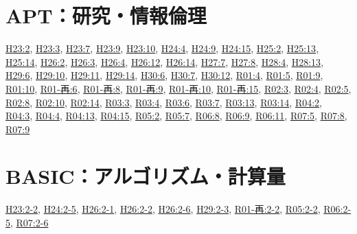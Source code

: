 \section{APT：研究・情報倫理}
\hyperref[q:h23-reg-apt-02]{H23:2}, \hyperref[q:h23-reg-apt-03]{H23:3}, \hyperref[q:h23-reg-apt-07]{H23:7}, \hyperref[q:h23-reg-apt-09]{H23:9}, \hyperref[q:h23-reg-apt-10]{H23:10}, \hyperref[q:h24-reg-apt-04]{H24:4}, \hyperref[q:h24-reg-apt-09]{H24:9}, \hyperref[q:h24-reg-apt-15]{H24:15}, \hyperref[q:h25-reg-apt-02]{H25:2}, \hyperref[q:h25-reg-apt-13]{H25:13}, \hyperref[q:h25-reg-apt-14]{H25:14}, \hyperref[q:h26-reg-apt-02]{H26:2}, \hyperref[q:h26-reg-apt-03]{H26:3}, \hyperref[q:h26-reg-apt-04]{H26:4}, \hyperref[q:h26-reg-apt-12]{H26:12}, \hyperref[q:h26-reg-apt-14]{H26:14}, \hyperref[q:h27-reg-apt-07]{H27:7}, \hyperref[q:h27-reg-apt-08]{H27:8}, \hyperref[q:h28-reg-apt-04]{H28:4}, \hyperref[q:h28-reg-apt-13]{H28:13}, \hyperref[q:h29-reg-apt-06]{H29:6}, \hyperref[q:h29-reg-apt-10]{H29:10}, \hyperref[q:h29-reg-apt-11]{H29:11}, \hyperref[q:h29-reg-apt-14]{H29:14}, \hyperref[q:h30-reg-apt-06]{H30:6}, \hyperref[q:h30-reg-apt-07]{H30:7}, \hyperref[q:h30-reg-apt-12]{H30:12}, \hyperref[q:r01-reg-apt-04]{R01:4}, \hyperref[q:r01-reg-apt-05]{R01:5}, \hyperref[q:r01-reg-apt-09]{R01:9}, \hyperref[q:r01-reg-apt-10]{R01:10}, \hyperref[q:r01-ret-apt-06]{R01-再:6}, \hyperref[q:r01-ret-apt-08]{R01-再:8}, \hyperref[q:r01-ret-apt-09]{R01-再:9}, \hyperref[q:r01-ret-apt-10]{R01-再:10}, \hyperref[q:r01-ret-apt-15]{R01-再:15}, \hyperref[q:r02-reg-apt-03]{R02:3}, \hyperref[q:r02-reg-apt-04]{R02:4}, \hyperref[q:r02-reg-apt-05]{R02:5}, \hyperref[q:r02-reg-apt-08]{R02:8}, \hyperref[q:r02-reg-apt-10]{R02:10}, \hyperref[q:r02-reg-apt-14]{R02:14}, \hyperref[q:r03-reg-apt-03]{R03:3}, \hyperref[q:r03-reg-apt-04]{R03:4}, \hyperref[q:r03-reg-apt-06]{R03:6}, \hyperref[q:r03-reg-apt-07]{R03:7}, \hyperref[q:r03-reg-apt-13]{R03:13}, \hyperref[q:r03-reg-apt-14]{R03:14}, \hyperref[q:r04-reg-apt-02]{R04:2}, \hyperref[q:r04-reg-apt-03]{R04:3}, \hyperref[q:r04-reg-apt-04]{R04:4}, \hyperref[q:r04-reg-apt-13]{R04:13}, \hyperref[q:r04-reg-apt-15]{R04:15}, \hyperref[q:r05-reg-apt-02]{R05:2}, \hyperref[q:r05-reg-apt-07]{R05:7}, \hyperref[q:r06-reg-apt-08]{R06:8}, \hyperref[q:r06-reg-apt-09]{R06:9}, \hyperref[q:r06-reg-apt-11]{R06:11}, \hyperref[q:r07-reg-apt-05]{R07:5}, \hyperref[q:r07-reg-apt-08]{R07:8}, \hyperref[q:r07-reg-apt-09]{R07:9}
\section{BASIC：アルゴリズム・計算量}
\hyperref[q:h23-reg-basic-2-2]{H23:2-2}, \hyperref[q:h24-reg-basic-2-5]{H24:2-5}, \hyperref[q:h26-reg-basic-2-1]{H26:2-1}, \hyperref[q:h26-reg-basic-2-2]{H26:2-2}, \hyperref[q:h26-reg-basic-2-6]{H26:2-6}, \hyperref[q:h29-reg-basic-2-3]{H29:2-3}, \hyperref[q:r01-ret-basic-2-2]{R01-再:2-2}, \hyperref[q:r05-reg-basic-2-2]{R05:2-2}, \hyperref[q:r06-reg-basic-2-5]{R06:2-5}, \hyperref[q:r07-reg-basic-2-6]{R07:2-6}
